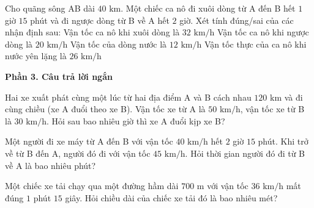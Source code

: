 \begin{ex} %
Cho quãng sông AB dài $40\text{ km}$. Một chiếc ca nô đi xuôi dòng từ A đến B hết $1$ giờ $15$ phút và đi ngược dòng từ B về A hết $2$ giờ. Xét tính đúng/sai của các nhận định sau:
\choiceTF
{\True Vận tốc ca nô khi xuôi dòng là $32\text{ km/h}$}
{\True Vận tốc ca nô khi ngược dòng là $20\text{ km/h}$}
{Vận tốc của dòng nước là $12\text{ km/h}$}
{\True Vận tốc thực của ca nô khi nước yên lặng là $26\text{ km/h}$}
\end{ex}

\textbf{Phần 3. Câu trả lời ngắn}

\begin{ex} %
Hai xe xuất phát cùng một lúc từ hai địa điểm A và B cách nhau $120\text{ km}$ và đi cùng chiều (xe A đuổi theo xe B). Vận tốc xe từ A là $50\text{ km/h}$, vận tốc xe từ B là $30\text{ km/h}$. Hỏi sau bao nhiêu giờ thì xe A đuổi kịp xe B?
\end{ex}

\begin{ex} %
Một người đi xe máy từ A đến B với vận tốc $40\text{ km/h}$ hết $2$ giờ $15$ phút. Khi trở về từ B đến A, người đó đi với vận tốc $45\text{ km/h}$. Hỏi thời gian người đó đi từ B về A là bao nhiêu phút?
\end{ex}

\begin{ex} %
Một chiếc xe tải chạy qua một đường hầm dài $700\text{ m}$ với vận tốc $36\text{ km/h}$ mất đúng $1$ phút $15$ giây. Hỏi chiều dài của chiếc xe tải đó là bao nhiêu mét?
\end{ex}


